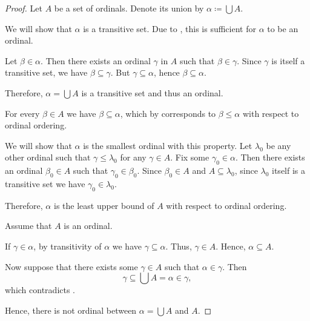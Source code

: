 \begin{proof}
   Let \( A \) be a set of ordinals. Denote its union by \( \alpha \coloneqq \bigcup A \).

  We will show that \( \alpha \) is a transitive set. Due to , this is sufficient for \( \alpha \) to be an ordinal.

  Let \( \beta \in \alpha \). Then there exists an ordinal \( \gamma \) in \( A \) such that \( \beta \in \gamma \). Since \( \gamma \) is itself a transitive set, we have \( \beta \subseteq \gamma \). But \( \gamma \subseteq \alpha \), hence \( \beta \subseteq \alpha \).

  Therefore, \( \alpha = \bigcup A \) is a transitive set and thus an ordinal.

   For every \( \beta \in A \) we have \( \beta \subseteq \alpha \), which by  corresponds to \( \beta \leq \alpha \) with respect to ordinal ordering.

  We will show that \( \alpha \) is the smallest ordinal with this property. Let \( \lambda_0 \) be any other ordinal such that \( \gamma \leq \lambda_0 \) for any \( \gamma \in A \). Fix some \( \gamma_0 \in \alpha \). Then there exists an ordinal \( \beta_0 \in A \) such that \( \gamma_0 \in \beta_0 \). Since \( \beta_0 \in A \) and \( A \subseteq \lambda_0 \), since \( \lambda_0 \) itself is a transitive set we have \( \gamma_0 \in \lambda_0 \).

  Therefore, \( \alpha \) is the least upper bound of \( A \) with respect to ordinal ordering.

   Assume that \( A \) is an ordinal.

  If \( \gamma \in \alpha \), by transitivity of \( \alpha \) we have \( \gamma \subseteq \alpha \). Thus, \( \gamma \in A \). Hence, \( \alpha \subseteq A \).

  Now suppose that there exists some \( \gamma \in A \) such that \( \alpha \in \gamma \). Then
  \begin{equation*}
    \gamma \subseteq \bigcup A = \alpha \in \gamma,
  \end{equation*}
  which contradicts .

  Hence, there is not ordinal between \( \alpha = \bigcup A \) and \( A \).
\end{proof}

